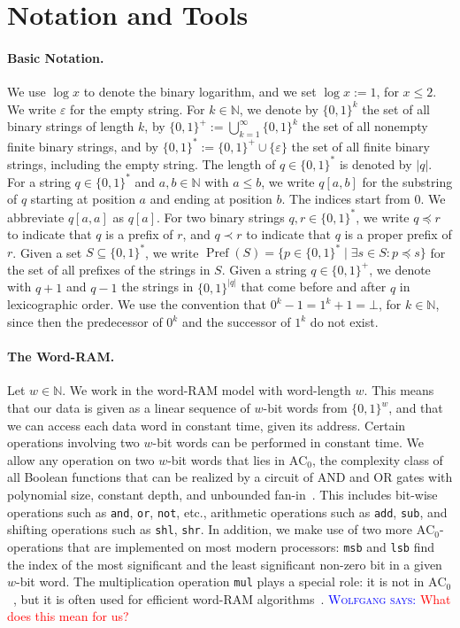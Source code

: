 \documentclass[a4paper,11pt]{article}
\newcommand{\eps}{\varepsilon}
\newcommand{\N}{\mathbb{N}}
\newcommand{\?}{\mskip1.5mu}
\DeclareMathOperator{\Pref}{Pref}
\newcommand{\aremark}[3]{\textcolor{blue}{\textsc{#1 #2:}}
  \textcolor{red}{\textsf{#3}}}
\newcommand{\wolfgang}[2][says]{\aremark{Wolfgang}{#1}{#2}}
\begin{document}
\section{Notation and Tools}
\label{sec:notation}

\paragraph{Basic Notation.}
We use $\log x$ to denote the binary logarithm, and we set 
$\log x := 1$, for $x \leq 2$.
We write $\eps$ for the empty string. For $k \in \N$, we denote by 
$\{0, 1\}^k$ the set of all binary strings of length $k$, by 
$\{0,1\}^+ := \bigcup_{k = 1}^{\infty} \{0, 1\}^k$ the set of all
nonempty finite binary strings, and by 
$\{0,1\}^* := \{0, 1\}^+ \cup \{\eps\}$ the set of all finite binary 
strings, including the empty string. 
The length of $q \in \{0, 1\}^*$ is denoted by $|q|$.
For a string $q \in \{0, 1\}^*$ and $a, b \in \N$ with $a \leq b$, 
we write $q[a, b]$ for the substring of $q$ starting at position
$a$ and ending at position $b$.  The indices start from $0$. 
We abbreviate $q[a, a]$ as $q[a]$. For two binary strings 
$q, r \in \{0,1\}^*$, we write $q \preceq r$ to indicate that $q$ is 
a prefix of $r$, and $q \prec r$ to indicate that $q$ is a proper 
prefix of $r$. 
Given a set $S \subseteq \{0, 1\}^*$, we write 
$\Pref(S) = \{p \in \{0, 1\}^* \mid \exists s \in S: p \preceq s\}$
for the set of all prefixes of the strings in $S$.
Given a string 
$q \in \{0,1\}^+$, we denote with $q + 1$ and $q - 1$ the strings in 
$\{0, 1\}^{|q|}$ that come before and after $q$ in lexicographic 
order. We use the convention that $0^k - 1 = 1^k + 1 = \bot$, for 
$k \in \N$, since then the predecessor of $0^k$ and the successor
of $1^k$ do not exist. 

\paragraph{The Word-RAM.}
Let $w \in \N$. We work in the word-RAM 
model with word-length $w$. This means that our data is given
as a linear sequence of $w$-bit words from $\{0, 1\}^w$, 
and that we can access each
data word in constant time, given its address. 
Certain operations involving two $w$-bit words
can be performed in constant time.
We allow any operation on two $w$-bit
words that lies in $\text{AC}_0$, the complexity class of
all Boolean functions that can be realized by a 
circuit of AND and OR gates with polynomial size, constant depth,
and unbounded fan-in~\cite{AroraBa09}.
This includes
bit-wise operations such as \texttt{and}, \texttt{or}, 
\texttt{not}, etc., arithmetic operations
such as \texttt{add}, \texttt{sub}, and
shifting operations such as \texttt{shl}, \texttt{shr}.
In addition, we make use of two more $\text{AC}_0$-operations that are 
implemented on most modern processors:
\texttt{msb} and \texttt{lsb} find the index of the
most significant and the least significant non-zero bit
in a given $w$-bit word.
The multiplication operation \texttt{mul} plays a special
role: it is not in $\text{AC}_0$~\cite{FurstSaSi84}, but it is often used
for efficient word-RAM algorithms~\cite{FredmanWi93}.
\wolfgang{What does this mean for us?}
\end{document}
